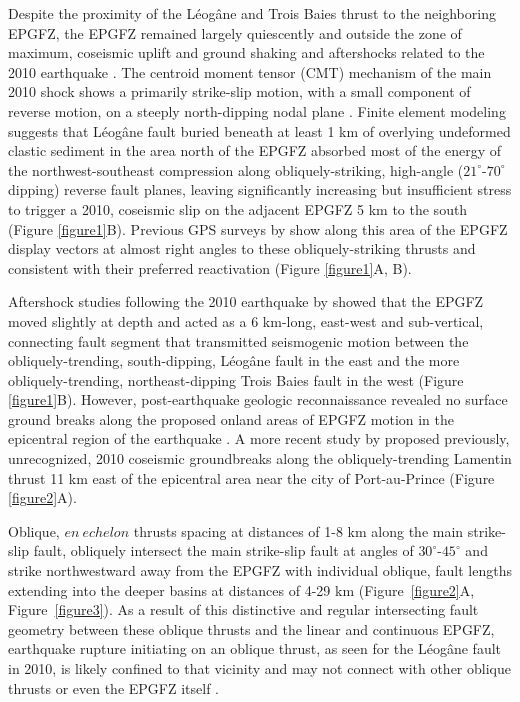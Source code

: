 \documentclass[linenumbers,draft]{agujournal}
\begin{document}
Despite the proximity of the L\'eog\^ane and Trois Baies thrust to the neighboring EPGFZ, the EPGFZ remained largely quiescently and outside the zone of maximum, coseismic uplift and ground shaking and aftershocks related to the 2010 earthquake \citep{nettles2010earthquake}. The centroid moment tensor (CMT) mechanism of the main 2010 shock shows a primarily strike-slip motion, with a small component of reverse motion, on a steeply north-dipping nodal plane \citep{nettles2010earthquake,douilly2013crustal}. Finite element modeling \citep{douilly2015three} suggests that L\'eog\^ane fault buried beneath at least 1 km of overlying undeformed clastic sediment in the area north of the EPGFZ absorbed most of the energy of the northwest-southeast compression along obliquely-striking, high-angle ($21^{\circ}$-$70^{\circ}$ dipping) reverse fault planes, leaving significantly increasing but insufficient stress to trigger a 2010, coseismic slip on the adjacent EPGFZ 5 km to the south (Figure \ref{figure1}B). Previous GPS surveys by \citet{calais2010transpressional,calais2016plate} show along this area of the EPGFZ display vectors at almost right angles to these obliquely-striking thrusts and consistent with their preferred reactivation (Figure \ref{figure1}A, B).

Aftershock studies following the 2010 earthquake by \citet{douilly2013crustal,douilly2015three} showed that the EPGFZ moved slightly at depth and acted as a 6 km-long, east-west and sub-vertical, connecting fault segment that transmitted seismogenic motion between the obliquely-trending, south-dipping, L\'eog\^ane fault in the east and the more obliquely-trending, northeast-dipping Trois Baies fault in the west (Figure \ref{figure1}B). However, post-earthquake geologic reconnaissance revealed no surface ground breaks along the proposed onland areas of EPGFZ motion in the epicentral region of the earthquake \citep{prentice2010seismic,koehler2011field,rathje2014geotechnical}. A more recent study by \citet{saint2015seismotectonics} proposed previously, unrecognized, 2010 coseismic groundbreaks along the obliquely-trending Lamentin thrust 11 km east of the epicentral area near the city of Port-au-Prince (Figure \ref{figure2}A).

Oblique, $en~echelon$ thrusts spacing at distances of 1-8 km along the main strike-slip fault, obliquely intersect the main strike-slip fault at angles of $30^{\circ}$-$45^{\circ}$ and strike northwestward away from the EPGFZ with individual oblique, fault lengths extending into the deeper basins at distances of 4-29 km (Figure~\ref{figure2}A, Figure~\ref{figure3}).  As a result of this distinctive and regular intersecting fault geometry between these oblique thrusts and the linear and continuous EPGFZ, earthquake rupture initiating on an oblique thrust, as seen for the L\'eog\^ane fault in 2010, is likely confined to that vicinity and may not connect with other oblique thrusts or even the EPGFZ itself \citep{douilly2013crustal,douilly2015three}.
\end{document}
